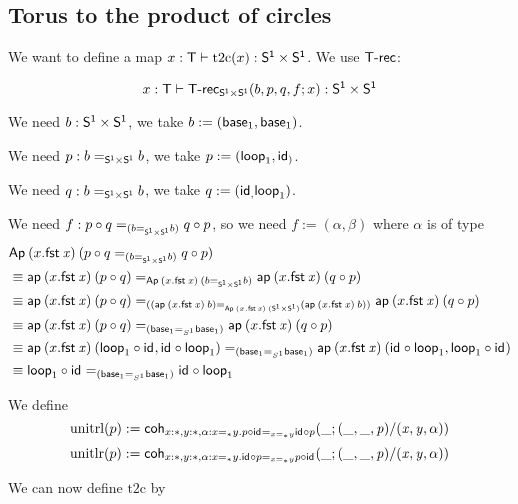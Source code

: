 \subsection{Torus to the product of circles}

\newcommand{\ttoc}{\mathrm{t2c}}
\newcommand{\ctot}{\mathrm{c2t}}
\newcommand{\PP}{\dsd{S^1\times S^1}}
\newcommand{\unitlr}{\mathrm{unitlr}}
\newcommand{\unitrl}{\mathrm{unitrl}}

We want to define a map $x:\dsd{T}\vdash\ttoc(x):\PP$. We use
$\mathsf{T\text{-}rec}$:

\[\ofglob{x:\dsd{T}}{\dsd{T\text{-}rec}_{\PP}(b,p,q,f;x)}{\PP}\]

We need $b:\PP$, we take $b:=(\mathsf{base}_{1},\mathsf{base}_{1})$.

We need $p:\homj{\PP}{b}{b}$, we take $p:=(\mathsf{loop}_{1},\mathsf{id}_{)}$.

We need $q:\homj{\PP}{b}{b}$, we take $q:=(\mathsf{id}_{,}\mathsf{loop}_{1})$.

We need $f:\homj{(\homj{\PP}{b}{b})}{p\circ q}{q\circ p}$, so we need
$f:=(\alpha, \beta)$ where $\alpha$ is of type
\begin{align*}
  &\Ap{(x.\fst x)}{(\homj{(\homj{\PP}{b}{b})}{p\circ q}{q\circ p})}\\
  &\equiv \homj{\Ap{(x.\fst x)}(\homj{\PP}{b}{b})}
  {\ap{(x.\fst x)}{(p\circ q)}}{\ap{(x.\fst x)}{(q\circ p)}} \\
  &\equiv \homj{(\homj{\Ap{(x.\fst x)}(\PP)}{(\ap{(x.\fst x)}b)}
    {(\ap{(x.\fst x)}b)})}
  {\ap{(x.\fst x)}{(p\circ q)}}{\ap{(x.\fst x)}{(q\circ p)}} \\
  &\equiv \homj{(\homj{S^1}{\base{1}}{\base{1}})}
  {\ap{(x.\fst x)}{(p\circ q)}}{\ap{(x.\fst x)}{(q\circ p)}} \\
  &\equiv \homj{(\homj{S^1}{\base{1}}{\base{1}})}
  {\ap{(x.\fst x)}{(\lp{1}\circ\id{},\id{}\circ\lp{1})}}
  {\ap{(x.\fst x)}{(\id{}\circ\lp{1}, \lp{1}\circ\id{})}} \\
  &\equiv \homj{(\homj{S^1}{\base{1}}{\base{1}})}
  {\lp{1}\circ\id{}}
  {\id{} \circ\lp{1}} \\
\end{align*}

We define
\[\unitrl(p):=\coh{x:\diagbase,y:\diagbase,\alpha:\homj{\diagbase}xy.
  \homj{\homj{\diagbase}xy}{p\circ\id{}}{\id{}\circ p}}{\_}
{(\_,\_,p)/(x,y,\alpha)}\]
\[\unitlr(p):=\coh{x:\diagbase,y:\diagbase,\alpha:\homj{\diagbase}xy.
  \homj{\homj{\diagbase}xy}{\id{}\circ p}{p\circ\id{}}}{\_}
{(\_,\_,p)/(x,y,\alpha)}\]

We can now define $\ttoc$ by

